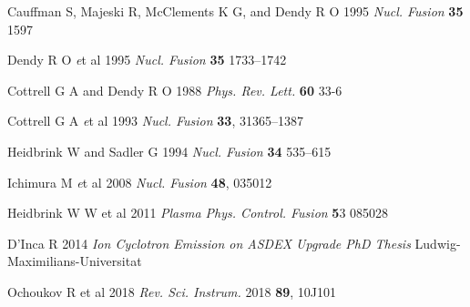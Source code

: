\documentclass[12pt]{iopart}
\begin{document}
\begin{thebibliography}{9}

Cauffman S, Majeski R, McClements K G, and Dendy R O 1995 \textit{Nucl. Fusion} \textbf{35} 1597

Dendy R O {\textit et al} 1995 \textit{Nucl. Fusion} \textbf{35} 1733–1742

Cottrell G A and Dendy R O 1988 \textit{Phys. Rev. Lett.} \textbf{60} 33-6

Cottrell G A {\textit et al} 1993 \textit{Nucl. Fusion} \textbf{33}, 31365–1387
% 

Heidbrink W and Sadler G 1994 \textit{Nucl. Fusion} \textbf{34} 535–615

Ichimura M {\textit et al} 2008 \textit{Nucl. Fusion} \textbf{48}, 035012

Heidbrink W W et al 2011 \textit{Plasma Phys. Control. Fusion} {\textbf 53} 085028

D’Inca R 2014 \textit{Ion Cyclotron Emission on ASDEX Upgrade PhD Thesis} Ludwig-Maximilians-Universitat

Ochoukov R et al 2018 \textit{Rev. Sci. Instrum.} 2018 \textbf{89}, 10J101


\end{thebibliography}
\end{document}
